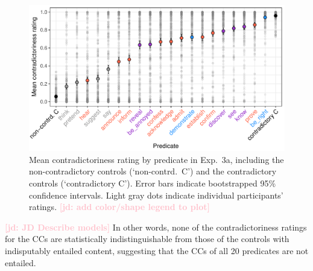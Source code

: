 \documentclass[11pt,fleqn]{article}
\newcommand{\jd}[1]{\textbf{\textcolor{Pink}{[jd: #1]}}}
\newcommand{\6}{\mbox{$[\hspace*{-.6mm}[$}}
\newcommand{\9}{\mbox{$]\hspace*{-.6mm}]$}}
\begin{document}
{%

\begin{figure}[h!]
\centering

\includegraphics[width=.7\paperwidth]{../../results/2-veridicality2/graphs/means-contradictoriness-by-predicate-variability}

\caption{Mean contradictoriness rating by predicate in Exp.~3a, including the non-contradictory controls (`non-contrd.\ C') and the contradictory controls (`contradictory C'). Error bars indicate bootstrapped 95\% confidence intervals. Light gray dots indicate individual participants' ratings. \jd{add color/shape legend to plot}} %
\label{f-veridicality-predicate2}
\end{figure}

\jd{JD Describe models} In other words, none of the contradictoriness ratings for the CCs are statistically indistinguishable from those of the controls with indisputably entailed content, suggesting that the CCs of all 20 predicates are not entailed.

}
\end{document}
